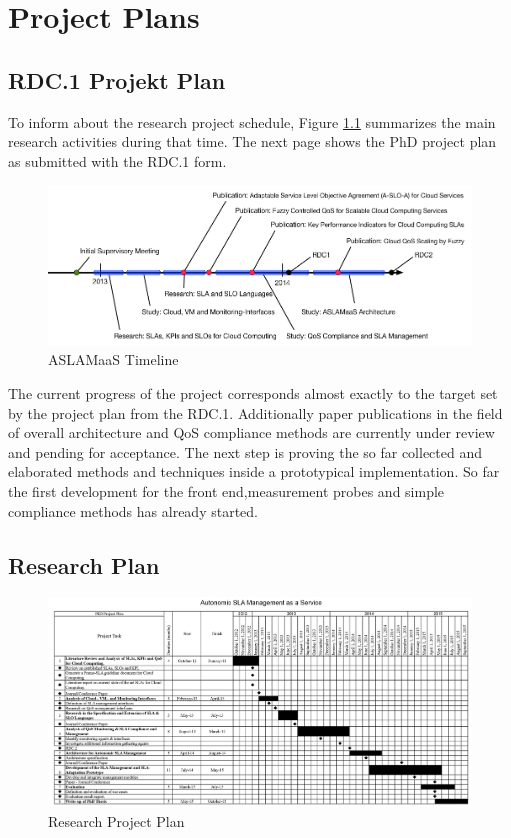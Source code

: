 
\chapter{Project Plans} %
\label{app:app02}
\section{RDC.1 Projekt Plan}
To inform about the research project schedule, Figure \ref{fig_time}  summarizes the main research activities during that time.
The next page shows the PhD project plan as submitted with the RDC.1 form.

\begin{figure}[!ht]
\centering
\includegraphics[width=6in]{chapters/appendices/timeline2.PNG}
\caption{ASLAMaaS Timeline}
\label{fig_time}
\end{figure}

The current progress of the project corresponds almost exactly to the target set by the project plan from the RDC.1. Additionally paper publications in the field of overall architecture and QoS compliance methods are currently under review and pending for acceptance. The next step is proving the so far collected and elaborated methods and techniques inside a prototypical implementation. So far the first development for the front end,measurement probes and simple compliance methods has already started.


\section{Research Plan}
\begin{figure}
	\centering
	\includegraphics[width=0.7\linewidth]{chapters/appendices/gant.PNG}
	\caption{Research Project Plan}
	\label{fig:gant}
\end{figure}
